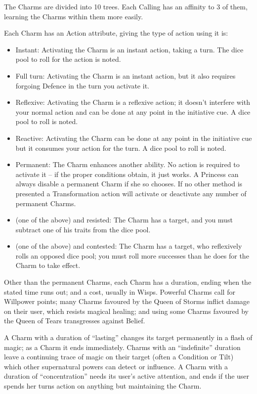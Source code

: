 The Charms are divided into 10 trees. Each Calling has an affinity to 3 of them, learning the Charms within them more easily. 

Each Charm has an Action attribute, giving the type of action using it is:

\begin{itemize}
\item Instant: Activating the Charm is an instant action, taking a turn. The dice pool to roll for the action is noted.
\item Full turn: Activating the Charm is an instant action, but it also requires forgoing Defence in the turn you activate it.
\item Reflexive: Activating the Charm is a reflexive action; it doesn't interfere with your normal action and can be done at any point in the initiative cue. A dice pool to roll is noted.
\item Reactive: Activating the Charm can be done at any point in the initiative cue but it consumes your action for the turn. A dice pool to roll is noted.
\item Permanent: The Charm enhances another ability. No action is required to activate it -- if the proper conditions obtain, it just works. A Princess can always disable a permanent Charm if she so chooses. If no other method is presented a Transformation action will activate or deactivate any number of permanent Charms. 
\item (one of the above) and resisted: The Charm has a target, and you must subtract one of his traits from the dice pool.
\item (one of the above) and contested: The Charm has a target, who reflexively rolls an opposed dice pool; you must roll more successes than he does for the Charm to take effect.
\end{itemize}
    
Other than the permanent Charms, each Charm has a duration, ending when the stated time runs out; and a cost, usually in Wisps. Powerful Charms call for Willpower points; many Charms favoured by the Queen of Storms inflict damage on their user, which resists magical healing; and using some Charms favoured by the Queen of Tears transgresses against Belief. 

A Charm with a duration of \textquotedblleft lasting” changes its target permanently in a flash of magic; as a Charm it ends immediately. Charms with an \textquotedblleft indefinite” duration leave a continuing trace of magic on their target (often a Condition or Tilt) which other supernatural powers can detect or influence. A Charm with a duration of \textquotedblleft concentration” needs its user’s active attention, and ends if the user spends her turns action on anything but maintaining the Charm.

